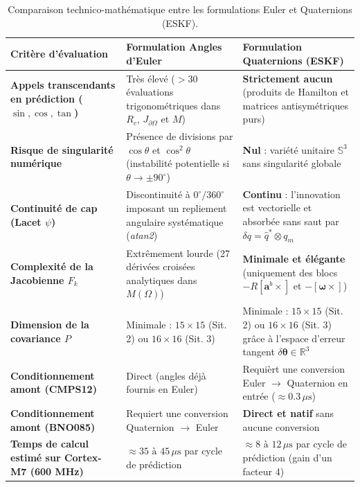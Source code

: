 \documentclass[../Formulations_Kalman.tex]{subfiles}
\begin{document}
\begin{table}[htbp]
\centering
\small
\begin{tabular}{p{4.8cm} p{5.2cm} p{5.4cm}}
\toprule
\textbf{Critère d'évaluation} & \textbf{Formulation Angles d'Euler} & \textbf{Formulation Quaternions (ESKF)} \\
\midrule
\textbf{Appels transcendants en prédiction ($\sin, \cos, \tan$)} & Très élevé ($> 30$ évaluations trigonométriques dans $R_c$, $J_{\partial\Omega}$ et $M$) & \textbf{Strictement aucun} (produits de Hamilton et matrices antisymétriques purs) \\
\midrule
\textbf{Risque de singularité numérique} & Présence de divisions par $\cos\theta$ et $\cos^2\theta$ (instabilité potentielle si $\theta \to \pm 90^\circ$) & \textbf{Nul} : variété unitaire $\mathbb{S}^3$ sans singularité globale \\
\midrule
\textbf{Continuité de cap (Lacet $\psi$)} & Discontinuité à $0^\circ / 360^\circ$ imposant un repliement angulaire systématique (\textit{atan2}) & \textbf{Continu} : l'innovation est vectorielle et absorbée sans saut par $\delta q = \hat{q}^* \otimes q_m$ \\
\midrule
\textbf{Complexité de la Jacobienne $F_k$} & Extrêmement lourde (27 dérivées croisées analytiques dans $M(\Omega)$) & \textbf{Minimale et élégante} (uniquement des blocs $-R[\mathbf{a}^b\times]$ et $-[\boldsymbol{\omega}\times]$) \\
\midrule
\textbf{Dimension de la covariance $P$} & Minimale : $15 \times 15$ (Sit. 2) ou $16 \times 16$ (Sit. 3) & Minimale : $15 \times 15$ (Sit. 2) ou $16 \times 16$ (Sit. 3) grâce à l'espace d'erreur tangent $\delta\boldsymbol{\theta} \in \mathbb{R}^3$ \\
\midrule
\textbf{Conditionnement amont (CMPS12)} & Direct (angles déjà fournis en Euler) & Requièrt une conversion Euler $\to$ Quaternion en entrée ($\approx 0.3\,\mu\text{s}$) \\
\midrule
\textbf{Conditionnement amont (BNO085)} & Requiert une conversion Quaternion $\to$ Euler & \textbf{Direct et natif} sans aucune conversion \\
\midrule
\textbf{Temps de calcul estimé sur Cortex-M7 (600 MHz)} & $\approx 35 \text{ à } 45\,\mu\text{s}$ par cycle de prédiction & \textbf{$\approx 8 \text{ à } 12\,\mu\text{s}$} par cycle de prédiction (gain d'un facteur 4) \\
\bottomrule
\end{tabular}
\caption{Comparaison technico-mathématique entre les formulations Euler et Quaternions (ESKF).}
\label{tab:comparatif_euler_quaternion}
\end{table}
\end{document}

